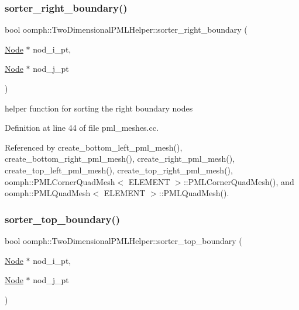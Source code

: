 \subsubsection{\texorpdfstring{sorter\+\_\+right\+\_\+boundary()}{sorter\_right\_boundary()}}
{\footnotesize\ttfamily bool oomph\+::\+Two\+Dimensional\+P\+M\+L\+Helper\+::sorter\+\_\+right\+\_\+boundary (\begin{DoxyParamCaption}\item[{\hyperlink{classoomph_1_1Node}{Node} $\ast$}]{nod\+\_\+i\+\_\+pt,  }\item[{\hyperlink{classoomph_1_1Node}{Node} $\ast$}]{nod\+\_\+j\+\_\+pt }\end{DoxyParamCaption})}



helper function for sorting the right boundary nodes 



Definition at line 44 of file pml\+\_\+meshes.\+cc.



Referenced by create\+\_\+bottom\+\_\+left\+\_\+pml\+\_\+mesh(), create\+\_\+bottom\+\_\+right\+\_\+pml\+\_\+mesh(), create\+\_\+right\+\_\+pml\+\_\+mesh(), create\+\_\+top\+\_\+left\+\_\+pml\+\_\+mesh(), create\+\_\+top\+\_\+right\+\_\+pml\+\_\+mesh(), oomph\+::\+P\+M\+L\+Corner\+Quad\+Mesh$<$ E\+L\+E\+M\+E\+N\+T $>$\+::\+P\+M\+L\+Corner\+Quad\+Mesh(), and oomph\+::\+P\+M\+L\+Quad\+Mesh$<$ E\+L\+E\+M\+E\+N\+T $>$\+::\+P\+M\+L\+Quad\+Mesh().

\mbox{\label{namespaceoomph_1_1TwoDimensionalPMLHelper_a98d2786e22298095bd190435d11c4f0e}} 
\subsubsection{\texorpdfstring{sorter\+\_\+top\+\_\+boundary()}{sorter\_top\_boundary()}}
{\footnotesize\ttfamily bool oomph\+::\+Two\+Dimensional\+P\+M\+L\+Helper\+::sorter\+\_\+top\+\_\+boundary (\begin{DoxyParamCaption}\item[{\hyperlink{classoomph_1_1Node}{Node} $\ast$}]{nod\+\_\+i\+\_\+pt,  }\item[{\hyperlink{classoomph_1_1Node}{Node} $\ast$}]{nod\+\_\+j\+\_\+pt }\end{DoxyParamCaption})}



